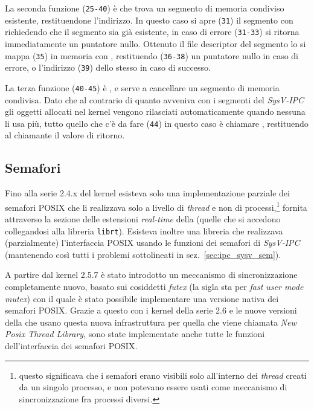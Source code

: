 La seconda funzione (\texttt{\small 25-40}) è  che trova un
segmento di memoria condiviso esistente, restituendone l'indirizzo. In questo
caso si apre (\texttt{\small 31}) il segmento con  richiedendo
che il segmento sia già esistente, in caso di errore (\texttt{\small 31-33})
si ritorna immediatamente un puntatore nullo.  Ottenuto il file descriptor del
segmento lo si mappa (\texttt{\small 35}) in memoria con ,
restituendo (\texttt{\small 36-38}) un puntatore nullo in caso di errore, o
l'indirizzo (\texttt{\small 39}) dello stesso in caso di successo.

La terza funzione (\texttt{\small 40-45}) è , e serve a
cancellare un segmento di memoria condivisa. Dato che al contrario di quanto
avveniva con i segmenti del \textit{SysV-IPC} gli oggetti allocati nel kernel
vengono rilasciati automaticamente quando nessuna li usa più, tutto quello che
c'è da fare (\texttt{\small 44}) in questo caso è chiamare ,
restituendo al chiamante il valore di ritorno.




\subsection{Semafori}
\label{sec:ipc_posix_sem}

Fino alla serie 2.4.x del kernel esisteva solo una implementazione parziale
dei semafori POSIX che li realizzava solo a livello di \textit{thread} e non
di processi,\footnote{questo significava che i semafori erano visibili solo
  all'interno dei \textit{thread} creati da un singolo processo, e non
  potevano essere usati come meccanismo di sincronizzazione fra processi
  diversi.} fornita attraverso la sezione delle estensioni \textit{real-time}
della  (quelle che si accedono collegandosi alla libreria
\texttt{librt}). Esisteva inoltre una libreria che realizzava (parzialmente)
l'interfaccia POSIX usando le funzioni dei semafori di \textit{SysV-IPC}
(mantenendo così tutti i problemi sottolineati in
sez.~\ref{sec:ipc_sysv_sem}).

A partire dal kernel 2.5.7 è stato introdotto un meccanismo di
sincronizzazione completamente nuovo, basato sui cosiddetti \textit{futex} (la
sigla sta per \textit{fast user mode mutex}) con il quale è stato possibile
implementare una versione nativa dei semafori POSIX.  Grazie a questo con i
kernel della serie 2.6 e le nuove versioni della  che usano questa
nuova infrastruttura per quella che viene chiamata \textit{New Posix Thread
  Library}, sono state implementate anche tutte le funzioni dell'interfaccia
dei semafori POSIX.

